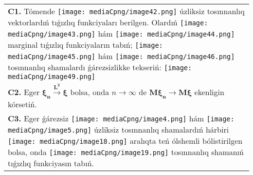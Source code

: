 \documentclass{article}
\begin{document}
\begin{tabular}{m{17cm}}
 \\
\textbf{C1.} Tómende \texttt{[image: mediaCpng/image42.png]} úzliksiz tosınnanlıq vektorlardıń tıǵızlıq funkciyaları berilgen. Olardıń \texttt{[image: mediaCpng/image43.png]} hám \texttt{[image: mediaCpng/image44.png]} marginal tıǵızlıq funkciyaların tabıń; \texttt{[image: mediaCpng/image45.png]} hám \texttt{[image: mediaCpng/image46.png]} tosınnanlıq shamalardı ǵárezsizlikke tekseriń: \texttt{[image: mediaCpng/image49.png]}
 \\
\textbf{C2.} Eger \(\mathbf{\xi}_{\mathbf{n}}\overset{\mathbf{L}^{\mathbf{2}}}{\rightarrow}\mathbf{\xi}\) bolsa, onda \(n \rightarrow \infty\) de \(\mathbf{M}\mathbf{\xi}_{\mathbf{n}}\mathbf{\rightarrow M\xi}\) ekenligin kórsetiń.
 \\
\textbf{C3.} Eger ǵárezsiz \texttt{[image: mediaCpng/image4.png]} hám \texttt{[image: mediaCpng/image5.png]} úzliksiz tosınnanlıq shamalardıń hárbiri \texttt{[image: mediaCpng/image18.png]} aralıqta teń ólshemli bólistirilgen bolsa, onda \texttt{[image: mediaCpng/image19.png]} tosınnanlıq shamanıń tıǵızlıq funkciyasın tabıń.
 \\

\end{tabular}
\vspace{1cm}
\end{document}
